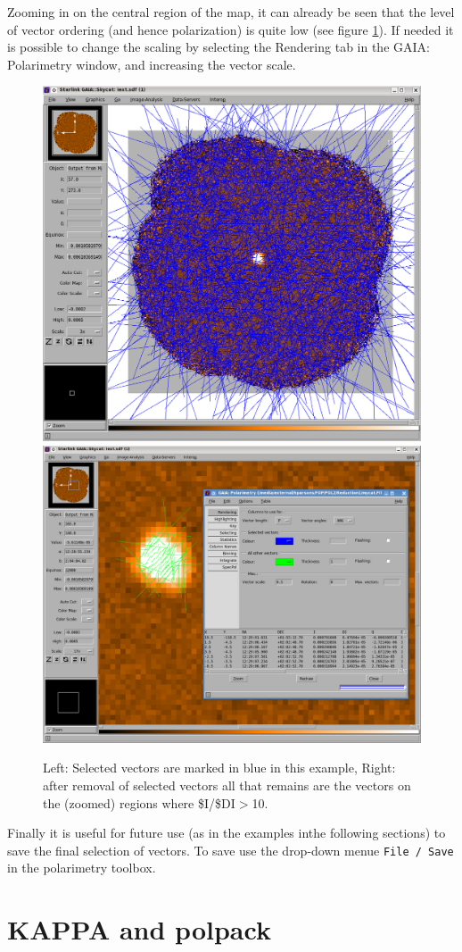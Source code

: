 Zooming in on the central region of the map, it can already be seen that the level of vector ordering
(and hence polarization) is quite low (see figure \ref{fig:gaia-plot-vectors3}). If needed it is
possible to change the scaling by selecting the Rendering tab in the GAIA: Polarimetry
window, and increasing the vector scale.


\begin{figure}[t!]
\begin{center}
\includegraphics[width=0.44\linewidth]{sc22-gaia-plot-vectors-5.png}
\includegraphics[width=0.52\linewidth]{sc22-gaia-plot-vectors-7.png}
\label{fig:gaia-plot-vectors3}
\caption [Over Plotting Vectors in GAIA]{
  \small Left: Selected vectors are marked in blue in this example, Right: after removal of selected
vectors all that remains are the vectors on the (zoomed) regions where \$I/\$DI$>$10.
}
\end{center}
\end{figure}


Finally it is useful for future use (as in the examples inthe following sections) to 
save the final selection of vectors. To save use the drop-down menue \texttt{File / Save} in 
the polarimetry toolbox.

\section{KAPPA and polpack}

